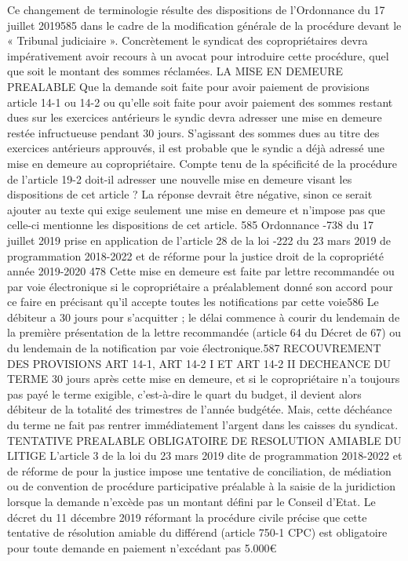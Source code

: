 Ce changement de terminologie résulte des dispositions de l’Ordonnance du 17 juillet 2019585 dans le cadre de la modification générale de la procédure devant le « Tribunal judiciaire ».
Concrètement le syndicat des copropriétaires devra impérativement avoir recours à un avocat pour introduire cette procédure, quel que soit le montant des sommes réclamées.
LA MISE EN DEMEURE PREALABLE
Que la demande soit faite pour avoir paiement de provisions article 14-1 ou 14-2 ou qu’elle soit faite pour avoir paiement des sommes restant dues sur les exercices antérieurs le syndic devra adresser une mise en demeure restée infructueuse pendant 30 jours.
S’agissant des sommes dues au titre des exercices antérieurs approuvés, il est probable que le syndic a déjà adressé une mise en demeure au copropriétaire. Compte tenu de la spécificité de la procédure de l’article 19-2 doit-il adresser une nouvelle mise en demeure visant les dispositions de cet article ? La réponse devrait être négative, sinon ce serait ajouter au texte qui exige seulement une mise en demeure et n’impose pas que celle-ci mentionne les dispositions de cet article.
585 Ordonnance -738 du 17 juillet 2019 prise en application de l'article 28 de la loi -222 du 23 mars 2019 de programmation 2018-2022 et de réforme pour la justice
droit de la copropriété année 2019-2020
478
Cette mise en demeure est faite par lettre recommandée ou par voie électronique si le copropriétaire a préalablement donné son accord pour ce faire en précisant qu’il accepte toutes les notifications par cette voie586
Le débiteur a 30 jours pour s’acquitter ; le délai commence à courir du lendemain de la première présentation de la lettre recommandée (article 64 du Décret de 67) ou du lendemain de la notification par voie électronique.587
RECOUVREMENT DES PROVISIONS ART 14-1, ART 14-2 I ET ART 14-2 II DECHEANCE DU TERME
30 jours après cette mise en demeure, et si le copropriétaire n'a toujours pas payé le terme exigible, c’est-à-dire le quart du budget, il devient alors débiteur de la totalité des trimestres de l'année budgétée.
Mais, cette déchéance du terme ne fait pas rentrer immédiatement l'argent dans les caisses du syndicat.
TENTATIVE PREALABLE OBLIGATOIRE DE RESOLUTION AMIABLE DU LITIGE
L’article 3 de la loi du 23 mars 2019 dite de programmation 2018-2022 et de réforme de pour la justice impose une tentative de conciliation, de médiation ou de convention de procédure participative préalable à la saisie de la juridiction lorsque la demande n’excède pas un montant défini par le Conseil d'Etat.
Le décret du 11 décembre 2019 réformant la procédure civile précise que cette tentative de résolution amiable du différend (article 750-1 CPC) est obligatoire pour toute demande en paiement n’excédant pas 5.000€
